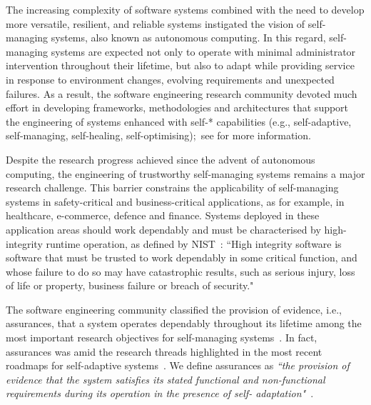 
The increasing complexity of software systems combined with the need to develop more versatile, resilient, and reliable systems instigated the vision of self-managing systems, also known as autonomous computing\cite{Kephart2003:Comp, Ganek2003:IBM}. In this regard, self-managing systems are expected not only to operate with minimal administrator intervention throughout their lifetime, but also to adapt while providing service in response to environment changes, evolving requirements and unexpected failures. As a result, the software engineering research community devoted much effort in developing frameworks, methodologies and architectures that support the engineering of systems enhanced with self-* capabilities (e.g., self-adaptive, self-managing, self-healing, self-optimising);~see \cite{Salehie2009:TAAS, Huebscher2008:ACM} for more information. 

Despite the research progress achieved since the advent of autonomous computing, the engineering of trustworthy self-managing systems remains a major research challenge. This barrier constrains the applicability of self-managing systems in safety-critical and business-critical applications, as for example, in healthcare, e-commerce, defence and finance. Systems deployed in these application areas should work dependably and must be characterised by high-integrity runtime operation, as defined by NIST~\cite{NIST}: ``High integrity software is software that must be trusted to work dependably in some critical function, and whose failure to do so may have catastrophic results, such as serious injury, loss of life or property, business failure or breach of security."

The software engineering community classified the provision of evidence, i.e., assurances, that a system operates dependably throughout its lifetime among the most important research objectives for self-managing systems~\cite{Cheng2009:Dagstuhl}. In fact, assurances was amid the research threads highlighted in the most recent roadmaps for self-adaptive systems~\cite{Lemos2013:Dagstuhl, Lemos2014:Dagstuhl}. We define assurances as \textit{``the provision of evidence that the system satisfies its stated functional and non-functional requirements during its operation in the presence of self- adaptation"}~\cite{Lemos2014:Dagstuhl}.

